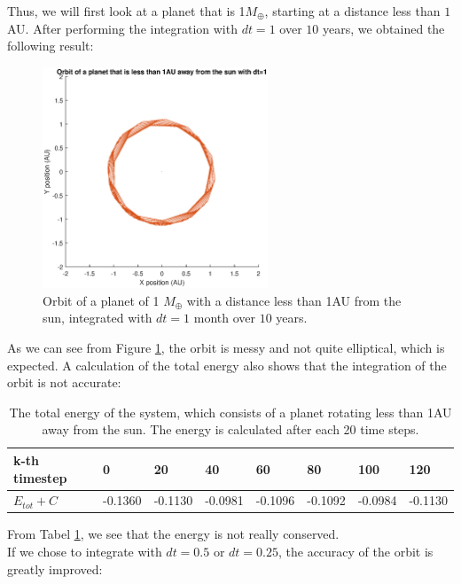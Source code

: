 Thus, we will first look at a planet that is 1$M_{\oplus}$, starting at a distance less than $1$ AU. 
After performing the integration with $dt=1$ over $10$ years, we obtained the following result:
\vspace{-20pt}
\begin{figure}[H]
\centering
\includegraphics[width=0.6\textwidth]{Planeet_1AU_dt1_10jaar.eps}
\caption{Orbit of a planet of 1 $M_{\oplus}$ with a distance less than 1AU from the sun, integrated with $dt=1$ month over $10$ years.}
    \label{fig:Planet1AUdt1}
\end{figure}

As we can see from Figure \ref{fig:Planet1AUdt1}, the orbit is messy and not quite elliptical, which is expected. 
A calculation of the total energy also shows that the integration of the orbit is not accurate:\\

\begin{table}[htb]
\centering
\caption{The total energy of the system, which consists of a planet rotating less than 1AU away from the sun. The energy is calculated after each 20 time steps.}
\begin{tabular}{|l|l|l|l|l|l|l|l|}
\hline
k-th timestep&0&20&40&60&80&100&120\\ \hline
$E_{tot}+C$&-0.1360&   -0.1130&   -0.0981&   -0.1096&   -0.1092&   -0.0984&   -0.1130\\ \hline
\end{tabular}
\label{tab:Planet1AUEnergy}
\end{table}

From Tabel \ref{tab:Planet1AUEnergy}, we see that the energy is not really conserved.\\

If we chose to integrate with $dt=0.5$ or $dt=0.25$, the accuracy of the orbit is greatly improved:

